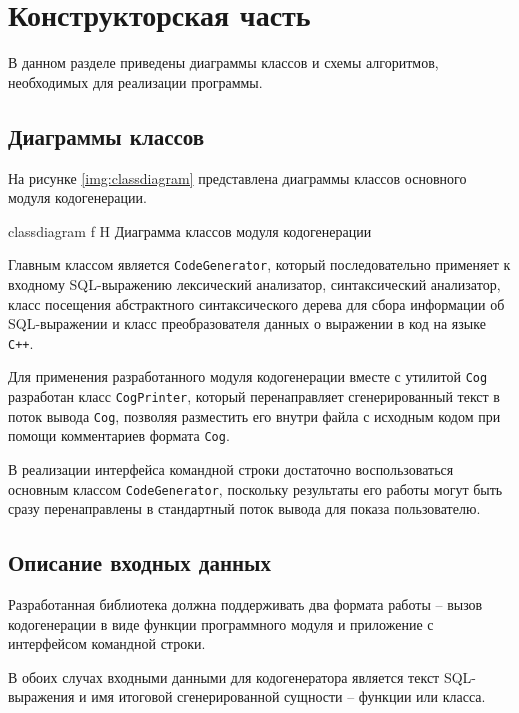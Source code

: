 \chapter{Конструкторская часть}
В данном разделе приведены диаграммы классов и схемы алгоритмов, необходимых для реализации программы.

\section{Диаграммы классов}
На рисунке \ref{img:classdiagram} представлена диаграммы классов основного модуля кодогенерации.

{classdiagram}
{f}
{H}
{\textwidth}
{Диаграмма классов модуля кодогенерации}

Главным классом является \texttt{CodeGenerator}, который последовательно применяет к входному SQL-выражению лексический анализатор, синтаксический анализатор, класс посещения абстрактного синтаксического дерева для сбора информации об SQL-выражении и класс преобразователя данных о выражении в код на языке \texttt{C++}.

Для применения разработанного модуля кодогенерации вместе с утилитой \texttt{Cog} разработан класс \texttt{CogPrinter}, который перенаправляет сгенерированный текст в поток вывода \texttt{Cog}, позволяя разместить его внутри файла с исходным кодом при помощи комментариев формата \texttt{Cog}.

В реализации интерфейса командной строки достаточно воспользоваться основным классом \texttt{CodeGenerator}, поскольку результаты его работы могут быть сразу перенаправлены в стандартный поток вывода для показа пользователю.

\section{Описание входных данных}
Разработанная библиотека должна поддерживать два формата работы -- вызов кодогенерации в виде функции программного модуля и приложение с интерфейсом командной строки.

В обоих случах входными данными для кодогенератора является текст SQL-выражения и имя итоговой сгенерированной сущности -- функции или класса.

